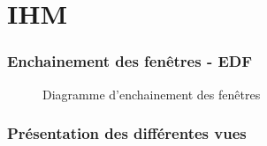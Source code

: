\part{IHM}
\setcounter{section}{0}

\section{Enchainement des fenêtres - EDF}

\begin{figure}[h]
\noindent{}
\caption{Diagramme d'enchainement des fenêtres}
\end{figure}

\clearpage
\section{Présentation des différentes vues}

%
